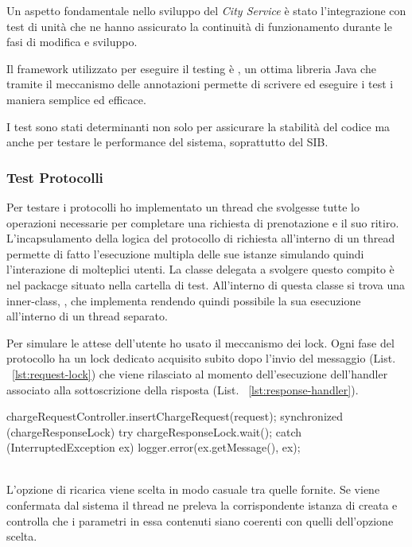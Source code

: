 Un aspetto fondamentale nello sviluppo del \emph{City Service} è stato l'integrazione con test di unità che ne hanno assicurato la continuità di funzionamento durante le fasi di modifica e sviluppo.

Il framework utilizzato per eseguire il testing è , un ottima libreria Java che tramite il meccanismo delle annotazioni permette di scrivere ed eseguire i test i maniera semplice ed efficace.

I test sono stati determinanti non solo per assicurare la stabilità del codice ma anche per testare le performance del sistema, soprattutto del SIB. 

\subsubsection{Test Protocolli}

Per testare i protocolli ho implementato un thread che svolgesse tutte lo operazioni necessarie per completare una richiesta di prenotazione e il suo ritiro. L'incapsulamento della logica del protocollo di richiesta all'interno di un thread permette di fatto l'esecuzione multipla delle sue istanze simulando quindi l'interazione di molteplici utenti. La classe delegata a svolgere questo compito è  nel packacge  situato nella cartella di test. All'interno di questa classe si trova una inner-class, , che implementa  rendendo quindi possibile la sua esecuzione all'interno di un thread separato. 

Per simulare le attese dell'utente ho usato il meccanismo dei lock. Ogni fase del protocollo ha un lock dedicato acquisito subito dopo l'invio del messaggio (List. ~\ref{lst:request-lock}) che viene rilasciato al momento dell'esecuzione dell'handler associato alla sottoscrizione della risposta (List. ~\ref{lst:response-handler}).

\begin{java}[caption={Inserimento della \code{CargeRequest} e attesa della risposta},label={lst:request-lock}]
chargeRequestController.insertChargeRequest(request);
synchronized (chargeResponseLock) {
	try {
		chargeResponseLock.wait();
	} catch (InterruptedException ex) {
		logger.error(ex.getMessage(), ex);
	}
}
\end{java}

\begin{java}[caption={Handler associato al messaggio di risposta},label={lst:response-handler}]
String subscriptionID = xmlTools.getSubscriptionID(xml);
if (chargeResponseSubId.equals(subscriptionID)) {
		[...]
		chargeResponsesUri = subscriptionResult.get(0);
		synchronized (chargeResponseLock) {
			chargeResponseLock.notify();
		}
	}
}
\end{java}
\\
\noindent
L'opzione di ricarica viene scelta in modo casuale tra quelle fornite. Se viene confermata dal sistema il thread ne preleva la corrispondente istanza di  creata e controlla che i parametri in essa contenuti siano coerenti con quelli dell'opzione scelta.

